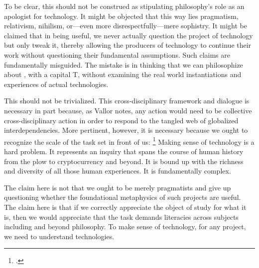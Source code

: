 \documentclass[letterpaper,notitlepage,12pt]{article}
\begin{document}
To be clear, this should not be construed as stipulating philosophy's role as an
apologist for technology.
It might be objected that this way lies pragmatism, relativism, nihilism,
or---even more disrespectfully---mere sophistry.
It might be claimed that in being useful, we never actually question the project
of technology but only tweak it, thereby allowing the producers of technology to
continue their work without questioning their fundamental assumptions.
Such claims are fundamentally misguided.
The mistake is in thinking that we can philosophize about
, with a capital T, without examining the real world
instantiations and experiences of actual technologies.

This should not be trivialized.
This cross-disciplinary framework and dialogue is necessary in part because, as 
Vallor notes, any action would need to be collective cross-disciplinary action
in order to respond to the tangled web of globalized interdependencies.
More pertinent, however, it is necessary because we ought to recognize the scale
of the task set in front of us: \footcite[p. 23]{vallor_technology_2018}
Making sense of technology is a hard problem.
It represents an inquiry that spans the course of human history from the plow to
cryptocurrency and beyond.
It is bound up with the richness and diversity of all those human experiences.
It is fundamentally complex.

The claim here is not that we ought to be merely pragmatists and give up
questioning whether the foundational metaphysics of such projects are useful.
The claim here is that if we correctly appreciate the object of study for what
it is, then we would appreciate that the task demands literacies across subjects
including and beyond philosophy.
To make sense of technology, for any project, we need to understand
technologies.
\end{document}
